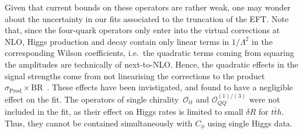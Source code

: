 Given that current bounds on these operators are rather weak, one may wonder about the uncertainty in our fits associated to the truncation of the EFT.
Note that, since the four-quark operators only enter into the virtual corrections at NLO, Higgs production and decay contain only linear terms in $1/\Lambda^{2}$ in the corresponding Wilson coefficients, i.e.~the quadratic terms coming from squaring the amplitudes are technically of next-to-NLO. 
Hence, the quadratic effects in the signal strengths come from not linearising the corrections to the product $\sigma_\mathrm{ Prod} \times \mathrm{ BR}$~\!.  These effects have been invistigated, and found to have a negligible effect on the fit. 
The operators of single chirality~$\mathcal O_{tt}$ and $\mathcal{O}_{QQ}^{(1)/(3)}$ were not included in the fit, as their effect on Higgs rates is limited to small $\delta R$ for $t\bar t h$. Thus, they cannot be contained simultaneously with $C_\phi$ using single Higgs data.  
